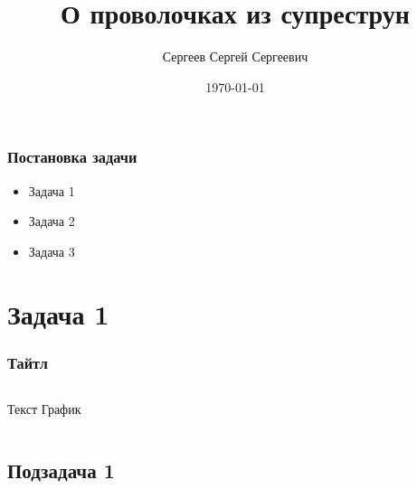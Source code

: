 \documentclass[10pt,pdf,aspectratio=169]{beamer}
\title[О проволочках из супреструн]{О проволочках из супреструн}
\author[Сергеев Сергей]{Сергеев Сергей Сергеевич}                 %
\institute{Кафедра Обобщенной Йоговой Обобщенности}      %
\date{\today}                    %
\begin{document}
\begin{frame}
  \titlepage
\end{frame}

\begin{frame}
  \tableofcontents
\end{frame}

\section{}

\begin{frame}
  \frametitle{Постановка задачи}   %

  \begin{itemize}
    \item Задача 1
    \item Задача 2
    \item Задача 3
  \end{itemize}
\end{frame}

\section{Задача 1}

\begin{frame}
  \frametitle{Тайтл}   %
  \begin{columns}[c]
  \column{2in}  %
    Текст
  \column{3in}
  График
  \end{columns}
\end{frame}

\subsection{Подзадача 1}
\end{document}

